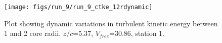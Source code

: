 \begin{figure}[H]
\centering
\texttt{[image: figs/run\_9/run\_9\_ctke\_12rdynamic]}
\caption{Plot showing dynamic variations in turbulent kinetic energy between 1 and 2 core radii. $z/c$=5.37, $V_{free}$=30.86, station 1.}
\label{fig:run_9_ctke_12rdynamic}
\end{figure}


